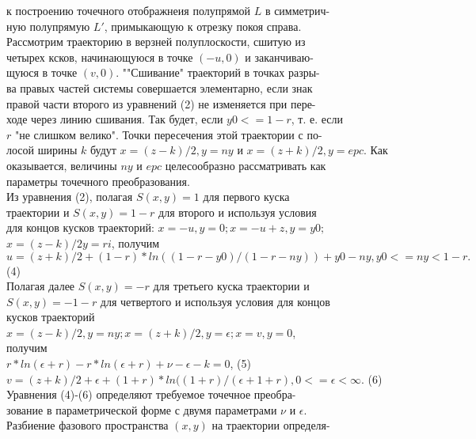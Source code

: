 \documentclass{article}
\begin{document}
к построению точечного отображнеия полупрямой $L$ в симметрич-\\
ную полупрямую $L'$, примыкающую к отрезку покоя справа.\\%
Рассмотрим траекторию в верзней полуплоскости, сшитую из\\
четырех ксков, начинающуюся в точке $(-u, 0)$ и заканчиваю-\\
щуюся в точке $(v,0)$. ""Сшивание" траекторий в точках разры-\\
ва правых частей системы совершается элементарно, если знак\\
правой части второго из уравнений (2) не изменяется при пере-\\
ходе через линию сшивания. Так будет, если $y0<=1-r$, т. е. если\\
$r$ "не слишком велико". Точки пересечения этой траектории с по-\\
лосой ширины $k$ будут $x=(z-k)/2, y=ny$ и $x=(z+k)/2, y=epc$. Как\\
оказывается, величины $ny$ и $epc$ целесообразно рассматривать как\\
параметры точечного преобразования.\\%
Из уравнения (2), полагая $S(x, y)=1$ для первого куска\\
траектории и $S(x, y)=1-r$ для второго и используя условия\\
для концов кусков траекторий: $x=-u, y=0; x=-u+z, y=y0;$\\
$x=(z-k)/2 y=ri$, получим\\
$u=(z+k)/2 + (1-r)*ln((1-r-y0)/(1-r-ny))+y0-ny, y0<=ny<1-r.$ (4)\\%
Полагая далее $S(x,y)=-r$ для третьего куска траектории и\\
$S(x, y)=-1-r$ для четвертого и используя условия для концов\\
кусков траекторий\\
$x=(z-k)/2, y=ny; x=(z+k)/2, y=\epsilon; x=v, y=0$,\\
получим\\
$r*ln(\epsilon + r) - r*ln(\epsilon+r)+\nu-\epsilon-k=0$, (5)\\
$v=(z+k)/2+\epsilon+(1+r)*ln((1+r)/(\epsilon+1+r), 0<=\epsilon<\infty$. (6)\\%
Уравнения (4)-(6) определяют требуемое точечное преобра-\\
зование в параметрической форме с двумя параметрами $\nu$ и $\epsilon$.\\
Разбиение фазового пространства $(x,y)$ на траектории определя-\\
\end{document}
